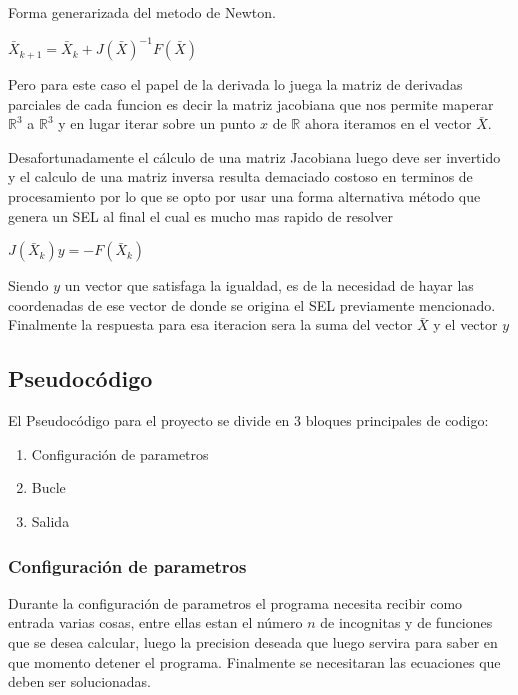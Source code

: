 \documentclass[11pt]{article}
\begin{document}
Forma generarizada del metodo de Newton.
 
\begin{center}
$\bar{X}_{k+1} = \bar{X}_{k} + {J(\bar{X})}^{-1}F(\bar{X})  \label{eq:2}$
\end{center}

Pero para este caso el papel de la derivada lo juega la matriz de derivadas parciales de cada funcion es decir la matriz jacobiana que nos permite maperar  $\mathbb{R}^3$ a $\mathbb{R}^3$ y en lugar iterar sobre un punto $x$ de $\mathbb{R}$  ahora iteramos en el vector $\bar{X}$. 

Desafortunadamente el cálculo de una matriz Jacobiana luego deve ser invertido y el calculo de una matriz inversa resulta demaciado costoso en terminos de procesamiento por lo que se opto por usar una forma alternativa método que genera un SEL al final el cual es mucho mas rapido de resolver\\

\begin{center}
$J(\bar{X}_{k})y = -F(\bar{X}_{k}) $
\end{center}

Siendo $y$ un vector que satisfaga la igualdad, es de la necesidad de hayar las coordenadas de ese vector de donde se origina el SEL previamente mencionado. Finalmente la respuesta para esa iteracion sera la suma del vector $\bar{X}$ y el vector $y$


\subsection{Pseudocódigo}
El Pseudocódigo para el proyecto se divide en 3 bloques principales de codigo:
\begin{enumerate}
  \item Configuración de parametros
  \item Bucle
  \item Salida
\end{enumerate}

\subsubsection{Configuración de parametros}
Durante la configuración de parametros el programa necesita recibir como entrada varias cosas, entre ellas estan el número  $n$ de incognitas y de funciones que se desea calcular, luego la precision deseada que luego servira para saber en que momento detener el programa. Finalmente se necesitaran las ecuaciones que deben ser solucionadas.
\end{document}
